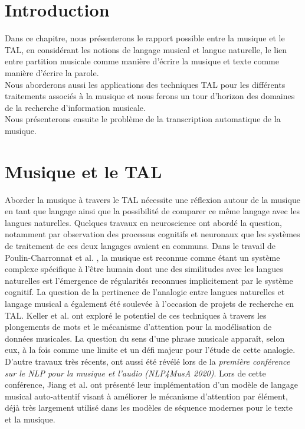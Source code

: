\section{Introduction}
Dans ce chapitre, nous présenterons le rapport possible entre la musique et le TAL, en considérant les notions de langage musical et langue naturelle, le lien entre partition musicale comme manière d’écrire la musique et texte comme manière d’écrire la parole.\\
Nous aborderons aussi les applications des techniques TAL pour les différents traitements associés à la musique et nous ferons un tour d’horizon des domaines de la recherche d’information musicale.\\ Nous présenterons ensuite le problème de la transcription automatique de la musique.
\section{Musique et le TAL}
Aborder la musique à travers le TAL nécessite une réflexion autour de la musique en tant que langage ainsi que la possibilité de comparer ce même langage avec les langues naturelles. Quelques travaux en neuroscience ont abordé la question, notamment par observation des processus cognitifs et neuronaux que les systèmes de traitement de ces deux langages avaient en communs. Dans le travail de Poulin-Charronnat et al. \cite{poulincharronnat:hal-01985213}, la musique est reconnue comme étant un système complexe spécifique à l’être humain dont une des similitudes avec les langues naturelles est l’émergence de régularités reconnues implicitement par le système cognitif. La question de la pertinence de l’analogie entre langues naturelles et langage musical a également été soulevée à l’occasion de projets de recherche en TAL. Keller et al. \cite{keller:hal-03279850} ont exploré le potentiel de ces techniques à travers les plongements de mots et le mécanisme d’attention pour la modélisation de données musicales. La question du sens d’une phrase musicale apparaît, selon eux, à la fois comme une limite et un défi majeur pour l’étude de cette analogie.\\
D’autre travaux très récents, ont aussi été révélé lors de la \textit{première conférence sur le NLP pour la musique et l'audio (NLP4MusA 2020)}. Lors de cette conférence, Jiang et al. \cite{Jiang2020DiscoveringMR} ont présenté leur implémentation d’un modèle de langage musical auto-attentif visant à améliorer le mécanisme d'attention par élément, déjà très largement utilisé dans les modèles de séquence modernes pour le texte et la musique.
